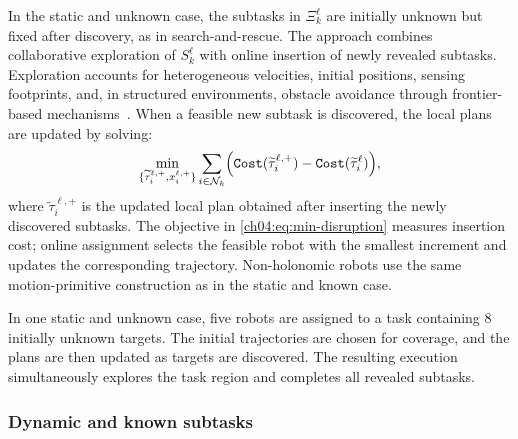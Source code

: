 In the static and unknown case, the subtasks in $\Xi_k^\ell$ are initially
unknown but fixed after discovery, as in search-and-rescue. The approach combines
collaborative exploration of $S_k^\ell$ with online insertion of newly revealed
subtasks. Exploration accounts for heterogeneous velocities, initial positions,
sensing footprints, and, in structured environments, obstacle avoidance through
frontier-based mechanisms~\citep{holz2010evaluating}. When a feasible new
subtask is discovered, the local plans are updated by solving:
\begin{equation}
\label{ch04:eq:min-disruption}
\min_{\{\widetilde{\tau}_i^{\ell,+},x_i^{\ell,+}\}}
\sum_{i\in\mathcal{N}_k}
\Bigl(
\texttt{Cost}(\widetilde{\tau}_i^{\ell,+})
-
\texttt{Cost}(\widetilde{\tau}_i^\ell)
\Bigr),
\end{equation}
where $\widetilde{\tau}_i^{\ell,+}$ is the updated local plan obtained after
inserting the newly discovered subtasks. The objective in \eqref{ch04:eq:min-disruption} measures insertion cost;
online assignment selects the feasible robot with the smallest increment and
updates the corresponding trajectory. Non-holonomic robots use the same
motion-primitive construction as in the static and known case.

\begin{example}
\label{ch04:example:StaticUnknown}
In one static and
unknown case, five robots are assigned to a task containing $8$ initially
unknown targets. The initial trajectories are chosen for coverage, and the
plans are then updated as targets are discovered. The resulting execution
simultaneously explores the task region and completes all revealed subtasks.
\end{example}

\subsubsection{Dynamic and known subtasks}
\label{ch04:sec:dynamicknown}

